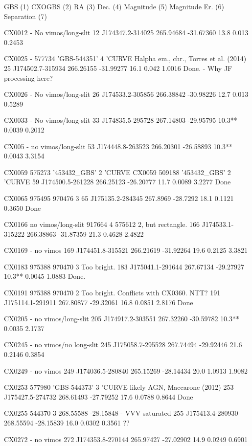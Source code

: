 GBS (1) CXOGBS (2) RA (3) Dec. (4) Magnitude (5) Magnitude Er. (6) Separation (7)

CX0012 - No vimos/long-slit
12 J174347.2-314025 265.94684 -31.67360 13.8 0.013 0.2453

CX0025 - 577734 'GBS-544351' 4 'CURVE   Halpha em., chr., Torres et al. (2014)
25 J174502.7-315934 266.26155 -31.99277 16.1 0.042 1.0016
Done. - Why JF processing here?

CX0026 - No vimos/long-slit
26 J174533.2-305856 266.38842 -30.98226 12.7 0.013 0.5289

CX0033 - No vimos/long-slit
33 J174835.5-295728 267.14803 -29.95795 10.3** 0.0039 0.2012

CX005 - no vimos/long-slit
53 J174448.8-263523 266.20301 -26.58893 10.3** 0.0043 3.3154

CX0059 575273 '453432_GBS' 2 'CURVE
CX0059 509188 '453432_GBS' 2 'CURVE
59 J174500.5-261228 266.25123 -26.20777 11.7 0.0089 3.2277
Done 

CX0065 975495  970476 3
65 J175135.2-284345 267.8969 -28.7292 18.1 0.1121 0.3650
Done 

CX0166	no vimos/long-slit 	917664    	4  575612 2, but rectangle.
166 J174533.1-315222 266.38863 -31.87359 21.3 0.4628 2.4822

CX0169 - no vimos
169 J174451.8-315521 266.21619 -31.92264 19.6 0.2125 3.3821

CX0183  975388  970470 3 Too bright. 
183 J175041.1-291644 267.67134 -29.27927 10.3** 0.0045 1.0883
Done. 

CX0191   975388	970470 	2 Too bright. Conflicts with CX0360. NTT? 
191 J175114.1-291911 267.80877 -29.32061 16.8 0.0851 2.8176
Done 

CX0205 - no vimos/long-slit
205 J174917.2-303551 267.32260 -30.59782 10.3** 0.0035 2.1737

CX0245 - no vimos/no long-slit
245 J175058.7-295528 267.74494 -29.92446 21.6 0.2146 0.3854

CX0249 - no vimos
249 J174036.5-280840 265.15269 -28.14434 20.0 1.0913 1.9082

CX0253 577980 'GBS-544373' 3 'CURVE   likely AGN, Maccarone (2012)
253 J175427.5-274732 268.61493 -27.79252 17.6 0.0788 0.8644
Done 

CX0255    544370    3		  268.55588     -28.15848 - VVV saturated 
255 J175413.4-280930 268.55594 -28.15839 16.0 0.0302 0.3561
??

CX0272 - no vimos
272 J174353.8-270144 265.97427 -27.02902 14.9 0.0249 0.6901

